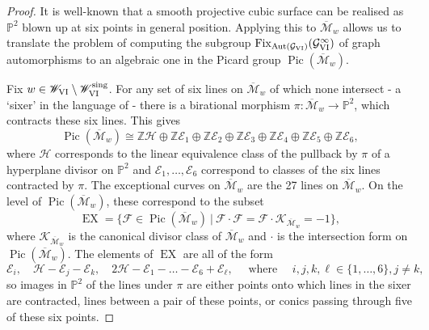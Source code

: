 \documentclass[a4paper,reqno]{amsart}
\numberwithin{equation}{section}
\newcommand{\Z}{\mathbb{Z}}
\newcommand{\p}{\mathbb{P}}
\newcommand{\E}{\mathcal{E}}
\newcommand{\F}{\mathcal{F}}
\newcommand{\h}{\mathcal{H}}
\newcommand{\Pic}{\operatorname{Pic}}
\numberwithin{equation}{section}
\begin{document}
\begin{proof}
        It is well-known that a smooth projective cubic surface can be realised as $\p^2$ blown up at six points in general position.        
        Applying this to $\overline{\mathcal{M}}_{w}$  allows us to translate the problem of computing the subgroup $\operatorname{Fix}_{\operatorname{Aut}(\mathcal{G}_{\rm{VI}})}(\mathcal{G}_{\rm{VI}}^\infty)$ of graph automorphisms to an algebraic one in the Picard group $\Pic(\overline{\mathcal{M}}_w)$.
       
        Fix $w \in \mathscr{W}_{\rm{VI}}\setminus \mathscr{W}_{\rm{VI}}^{\operatorname{sing}}$.
        For any set of six lines on $\overline{\mathcal{M}}_w$ of which none intersect - a `sixer' in the language of \cite{dolgachevclassicalAG} - 
        there is a birational morphism $\pi :\overline{\mathcal{M}}_w\to \p^2$, which contracts these six lines.
    This gives 
    $$\Pic(\overline{\mathcal{M}}_w) \cong \Z \mathcal{H} \oplus \Z \E_1 \oplus \Z \E_2\oplus \Z \E_3\oplus \Z \E_4\oplus \Z \E_5\oplus \Z \E_6,$$
    where $\h$ corresponds to the linear equivalence class of the pullback by $\pi$ of a hyperplane divisor on $\p^2$ and $\E_1,\dots,\E_6$ correspond to classes of the six lines contracted by $\pi$.
    The exceptional curves on $\overline{\mathcal{M}}_w$ are the 27 lines on $\overline{\mathcal{M}}_w$.
    On the level of $\Pic(\overline{\mathcal{M}}_w)$, these correspond to the subset 
    $$\operatorname{EX} = \{\F\in \Pic(\overline{\mathcal{M}}_w) ~|~ \F\cdot\F =\F \cdot \mathcal{K}_{\overline{\mathcal{M}}_w}= -1\},$$
    where $\mathcal{K}_{\overline{\mathcal{M}}_w}$ is the canonical divisor class of $\overline{\mathcal{M}}_w$ and $\cdot $ is the intersection form on $\Pic(\overline{\mathcal{M}}_w)$.
    The elements of $\operatorname{EX}$ are all of the form
    $$\E_i, \quad \h - \E_j - \E_k, \quad 2\h - \E_{1}-\dots-\E_6 + \E_{\ell},\quad \text{ where } \quad i,j,k,\ell\in\{1,\dots,6\}, j\neq k,$$
    so images in $\p^2$ of the lines under $\pi$ are either points onto which lines in the sixer are contracted, lines between a pair of these points, or conics passing through five of these six points.
    

\end{proof}
\end{document}

